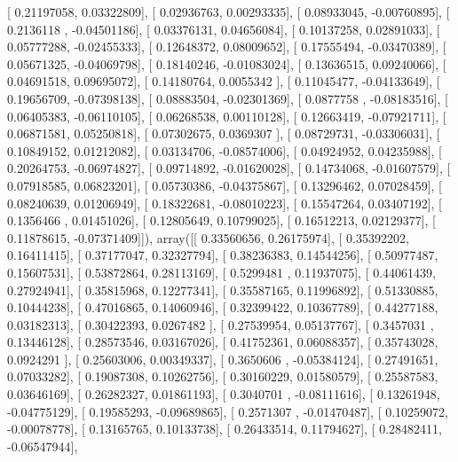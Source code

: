 \documentclass{article}
\begin{document}
       [ 0.21197058,  0.03322809],
       [ 0.02936763,  0.00293335],
       [ 0.08933045, -0.00760895],
       [ 0.2136118 , -0.04501186],
       [ 0.03376131,  0.04656084],
       [ 0.10137258,  0.02891033],
       [ 0.05777288, -0.02455333],
       [ 0.12648372,  0.08009652],
       [ 0.17555494, -0.03470389],
       [ 0.05671325, -0.04069798],
       [ 0.18140246, -0.01083024],
       [ 0.13636515,  0.09240066],
       [ 0.04691518,  0.09695072],
       [ 0.14180764,  0.0055342 ],
       [ 0.11045477, -0.04133649],
       [ 0.19656709, -0.07398138],
       [ 0.08883504, -0.02301369],
       [ 0.0877758 , -0.08183516],
       [ 0.06405383, -0.06110105],
       [ 0.06268538,  0.00110128],
       [ 0.12663419, -0.07921711],
       [ 0.06871581,  0.05250818],
       [ 0.07302675,  0.0369307 ],
       [ 0.08729731, -0.03306031],
       [ 0.10849152,  0.01212082],
       [ 0.03134706, -0.08574006],
       [ 0.04924952,  0.04235988],
       [ 0.20264753, -0.06974827],
       [ 0.09714892, -0.01620028],
       [ 0.14734068, -0.01607579],
       [ 0.07918585,  0.06823201],
       [ 0.05730386, -0.04375867],
       [ 0.13296462,  0.07028459],
       [ 0.08240639,  0.01206949],
       [ 0.18322681, -0.08010223],
       [ 0.15547264,  0.03407192],
       [ 0.1356466 ,  0.01451026],
       [ 0.12805649,  0.10799025],
       [ 0.16512213,  0.02129377],
       [ 0.11878615, -0.07371409]]), array([[ 0.33560656,  0.26175974],
       [ 0.35392202,  0.16411415],
       [ 0.37177047,  0.32327794],
       [ 0.38236383,  0.14544256],
       [ 0.50977487,  0.15607531],
       [ 0.53872864,  0.28113169],
       [ 0.5299481 ,  0.11937075],
       [ 0.44061439,  0.27924941],
       [ 0.35815968,  0.12277341],
       [ 0.35587165,  0.11996892],
       [ 0.51330885,  0.10444238],
       [ 0.47016865,  0.14060946],
       [ 0.32399422,  0.10367789],
       [ 0.44277188,  0.03182313],
       [ 0.30422393,  0.0267482 ],
       [ 0.27539954,  0.05137767],
       [ 0.3457031 ,  0.13446128],
       [ 0.28573546,  0.03167026],
       [ 0.41752361,  0.06088357],
       [ 0.35743028,  0.0924291 ],
       [ 0.25603006,  0.00349337],
       [ 0.3650606 , -0.05384124],
       [ 0.27491651,  0.07033282],
       [ 0.19087308,  0.10262756],
       [ 0.30160229,  0.01580579],
       [ 0.25587583,  0.03646169],
       [ 0.26282327,  0.01861193],
       [ 0.3040701 , -0.08111616],
       [ 0.13261948, -0.04775129],
       [ 0.19585293, -0.09689865],
       [ 0.2571307 , -0.01470487],
       [ 0.10259072, -0.00078778],
       [ 0.13165765,  0.10133738],
       [ 0.26433514,  0.11794627],
       [ 0.28482411, -0.06547944],
\end{document}

